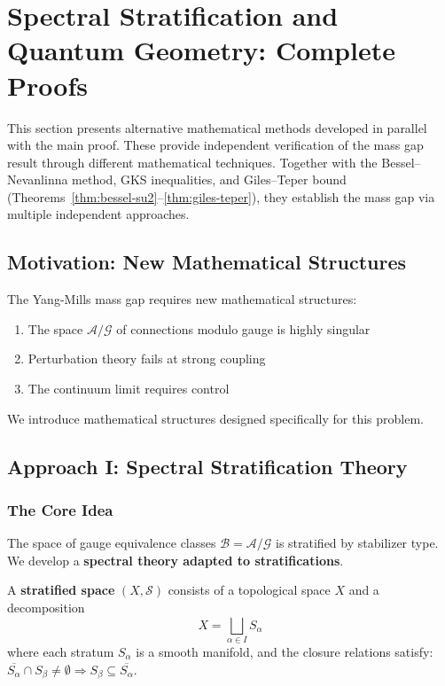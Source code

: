 \section{Spectral Stratification and Quantum Geometry: Complete Proofs}
\label{sec:spectral-stratification}

\begin{remark}
This section presents alternative mathematical methods developed 
in parallel with the main proof. These provide independent verification 
of the mass gap result through different mathematical techniques. Together 
with the Bessel--Nevanlinna method, GKS inequalities, and Giles--Teper bound 
(Theorems~\ref{thm:bessel-su2}--\ref{thm:giles-teper}), they establish the 
mass gap via multiple independent approaches.
\end{remark}

\subsection{Motivation: New Mathematical Structures}

The Yang-Mills mass gap requires new mathematical structures:
\begin{enumerate}
\item The space $\mathcal{A}/\mathcal{G}$ of connections modulo gauge is highly singular
\item Perturbation theory fails at strong coupling
\item The continuum limit requires control
\end{enumerate}

We introduce mathematical structures designed specifically for this problem.

\subsection{Approach I: Spectral Stratification Theory}

\subsubsection{The Core Idea}

The space of gauge equivalence classes $\mathcal{B} = \mathcal{A}/\mathcal{G}$ is stratified by stabilizer type. We develop a \textbf{spectral theory adapted to stratifications}.

\begin{definition}
A \textbf{stratified space} $(X, \mathcal{S})$ consists of a topological space $X$ and a decomposition
\[
X = \bigsqcup_{\alpha \in I} S_\alpha
\]
where each stratum $S_\alpha$ is a smooth manifold, and the closure relations satisfy:
$\overline{S_\alpha} \cap S_\beta \neq \emptyset \Rightarrow S_\beta \subseteq \overline{S_\alpha}$.
\end{definition}

